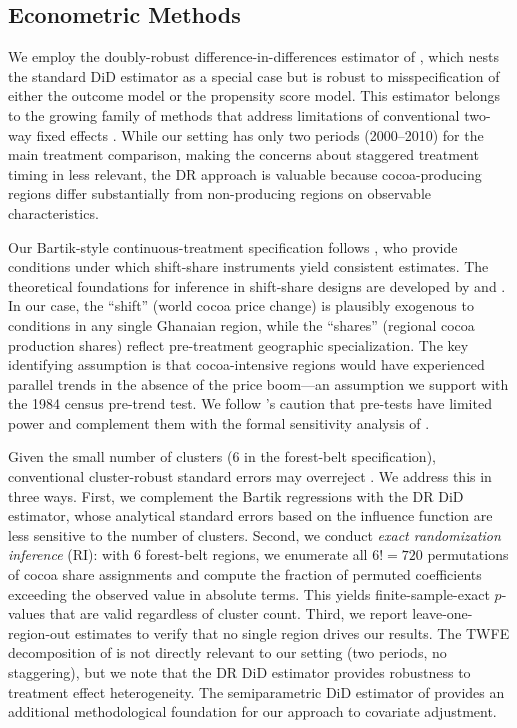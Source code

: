 \documentclass[12pt]{article}
\begin{document}
\subsection{Econometric Methods}

We employ the doubly-robust difference-in-differences estimator of \citet{santanna2020}, which nests the standard DiD estimator as a special case but is robust to misspecification of either the outcome model or the propensity score model. This estimator belongs to the growing family of methods that address limitations of conventional two-way fixed effects \citep{dechaisemartin2020, callaway2021}. While our setting has only two periods (2000--2010) for the main treatment comparison, making the concerns about staggered treatment timing in \citet{callaway2021} less relevant, the DR approach is valuable because cocoa-producing regions differ substantially from non-producing regions on observable characteristics.

Our Bartik-style continuous-treatment specification follows \citet{goldsmith2020}, who provide conditions under which shift-share instruments yield consistent estimates. The theoretical foundations for inference in shift-share designs are developed by \citet{adao2019} and \citet{borusyak2022}. In our case, the ``shift'' (world cocoa price change) is plausibly exogenous to conditions in any single Ghanaian region, while the ``shares'' (regional cocoa production shares) reflect pre-treatment geographic specialization. The key identifying assumption is that cocoa-intensive regions would have experienced parallel trends in the absence of the price boom---an assumption we support with the 1984 census pre-trend test. We follow \citet{roth2023}'s caution that pre-tests have limited power and complement them with the formal sensitivity analysis of \citet{cinelli2020}.

Given the small number of clusters (6 in the forest-belt specification), conventional cluster-robust standard errors may overreject \citep{cameron2008, mackinnon2017}. We address this in three ways. First, we complement the Bartik regressions with the DR DiD estimator, whose analytical standard errors based on the influence function are less sensitive to the number of clusters. Second, we conduct \textit{exact randomization inference} (RI): with 6 forest-belt regions, we enumerate all $6! = 720$ permutations of cocoa share assignments and compute the fraction of permuted coefficients exceeding the observed value in absolute terms. This yields finite-sample-exact $p$-values that are valid regardless of cluster count. Third, we report leave-one-region-out estimates to verify that no single region drives our results. The TWFE decomposition of \citet{goodmanbacon2021} is not directly relevant to our setting (two periods, no staggering), but we note that the DR DiD estimator provides robustness to treatment effect heterogeneity. The semiparametric DiD estimator of \citet{abadie2005} provides an additional methodological foundation for our approach to covariate adjustment.
\end{document}
